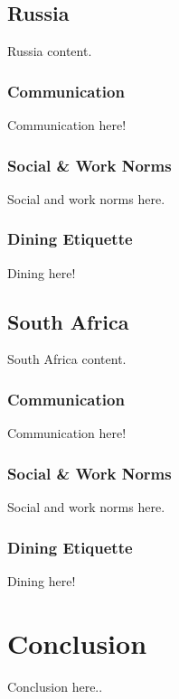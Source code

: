 \documentclass[11pt,a4paper,oneside]{report}
\begin{document}
\subsection{Russia}\label{second}
Russia content.

\subsubsection{Communication}\label{third}
Communication here!

\subsubsection{Social \& Work Norms}\label{third}
Social and work norms here.

\subsubsection{Dining Etiquette}\label{third}
Dining here!

\subsection{South Africa}\label{second}

South Africa content.

\subsubsection{Communication}\label{third}
Communication here!

\subsubsection{Social \& Work Norms}\label{third}
Social and work norms here.

\subsubsection{Dining Etiquette}\label{third}
Dining here!

\section{Conclusion}\label{first}
Conclusion here..
\end{document}
